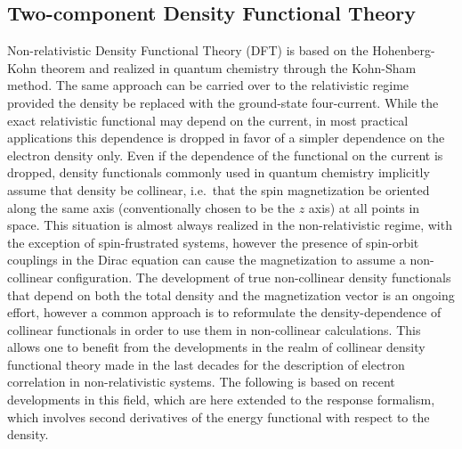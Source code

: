 \documentclass[12pt]{article}
\begin{document}
\subsection{Two-component Density Functional Theory}
Non-relativistic Density Functional Theory (DFT) is based on the Hohenberg-Kohn theorem and realized in quantum chemistry through the Kohn-Sham method.
The same approach can be carried over to the relativistic regime provided the density be replaced with the ground-state four-current.\cite{Rajagopal78_L943,Vosko79_2977}
While the exact relativistic functional may depend on the current, in most practical applications this dependence is dropped in favor of a simpler dependence on the electron density only.
Even if the dependence of the functional on the current is dropped, density functionals commonly used in quantum chemistry implicitly assume that density be collinear, i.e.\ that the spin magnetization be oriented along the same axis (conventionally chosen to be the $z$ axis) at all points in space.
This situation is almost always realized in the non-relativistic regime, with the exception of spin-frustrated systems, however the presence of spin-orbit couplings in the Dirac equation can cause the magnetization to assume a non-collinear configuration.
The development of true non-collinear density functionals that depend on both the total density and the magnetization vector is an ongoing effort,\cite{Gross13_156401} however a common approach is to reformulate the density-dependence of collinear functionals in order to use them in non-collinear calculations.
This allows one to benefit from the developments in the realm of collinear density functional theory made in the last decades for the description of electron correlation in non-relativistic systems.
The following is based on recent developments in this field,\cite{vanWullen02_779,Frisch07_125119,Frisch12_2193,Scuseria13_035117} which are here extended to the response formalism, which involves second derivatives of the energy functional with respect to the density.
\end{document}
